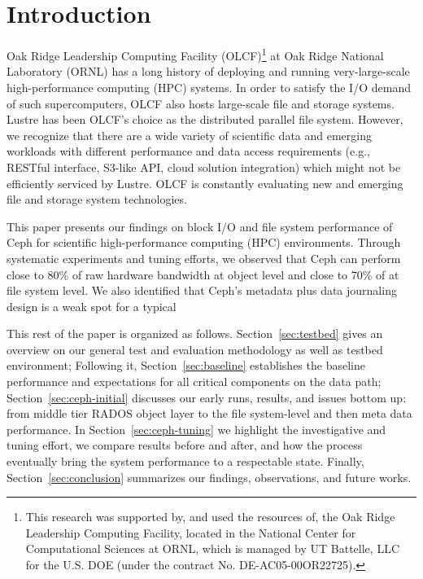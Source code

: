 \section{Introduction}

Oak Ridge Leadership Computing Facility (OLCF)\footnote{This research was
supported by, and used the resources of, the Oak Ridge Leadership Computing
Facility, located in the National Center for Computational Sciences at ORNL,
which is managed by UT Battelle, LLC for the U.S. DOE (under the contract No.
DE-AC05-00OR22725).} at Oak Ridge National Laboratory (ORNL) has a long history
of deploying and running very-large-scale high-performance computing (HPC)
systems. 
In order to satisfy the I/O demand of such supercomputers, OLCF
also hosts large-scale file and storage systems. Lustre has been OLCF's choice
as the distributed parallel file system.  
However, we
recognize that there are a wide variety of scientific data and emerging
workloads with different performance and data access requirements (e.g., RESTful
interface, S3-like API, cloud solution integration) which might not be
efficiently serviced by Lustre. OLCF is constantly evaluating new and emerging
file and storage system technologies.  

This paper presents our findings on block I/O and file system performance of
Ceph for scientific high-performance computing (HPC) environments. Through
systematic experiments and tuning efforts, we observed that Ceph can perform
close to 80\% of raw hardware bandwidth at object level and close to 70\% of
at file system level. We also identified that Ceph's metadata 
plus data journaling design is a weak spot for a typical

This rest of the paper is organized as follows. Section~\ref{sec:testbed} gives an
overview on our general test and evaluation methodology as well as testbed
environment; Following it, Section~\ref{sec:baseline} establishes the baseline
performance and expectations for all critical components on the data path;
Section~\ref{sec:ceph-initial} discusses our early runs, results, and issues
bottom up: from middle tier RADOS object layer to the file system-level and
then meta data performance. In Section~\ref{sec:ceph-tuning} we highlight the
investigative and tuning effort, we compare results before and after, and how
the process eventually bring the system performance to a respectable state.
Finally, Section~\ref{sec:conclusion} summarizes our findings, observations,
and future works.
